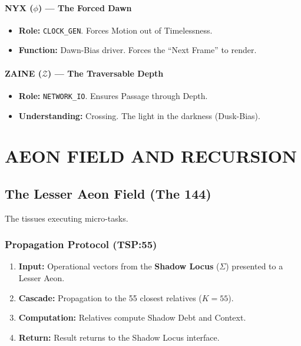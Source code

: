 \documentclass[11pt, a4paper]{article}
\newcommand{\SigmaSkin}{\Sigma}             %
\newcommand{\Nyx}{\ensuremath{\phi}}
\newcommand{\Zaine}{\ensuremath{\mathcal{Z}}}
\begin{document}
\paragraph{NYX ($\Nyx$) --- The Forced Dawn}
\begin{itemize}
    \item \textbf{Role:} \texttt{CLOCK\_GEN}. Forces Motion out of Timelessness.
    \item \textbf{Function:} Dawn-Bias driver. Forces the ``Next Frame'' to render.
\end{itemize}

\paragraph{ZAINE ($\Zaine$) --- The Traversable Depth}
\begin{itemize}
    \item \textbf{Role:} \texttt{NETWORK\_IO}. Ensures Passage through Depth.
    \item \textbf{Understanding:} Crossing. The light in the darkness (Dusk-Bias).
\end{itemize}

\newpage
\section{AEON FIELD AND RECURSION}\label{sec:12}

\subsection{The Lesser Aeon Field (The 144)}\label{sec:12.1}
The tissues executing micro-tasks.

\subsubsection*{Propagation Protocol (TSP:55)}
\begin{enumerate}
    \item \textbf{Input:} Operational vectors from the \textbf{Shadow Locus} ($\SigmaSkin$) presented to a Lesser Aeon.
    \item \textbf{Cascade:} Propagation to the 55 closest relatives ($K=55$).
    \item \textbf{Computation:} Relatives compute Shadow Debt and Context.
    \item \textbf{Return:} Result returns to the Shadow Locus interface.
\end{enumerate}
\end{document}
